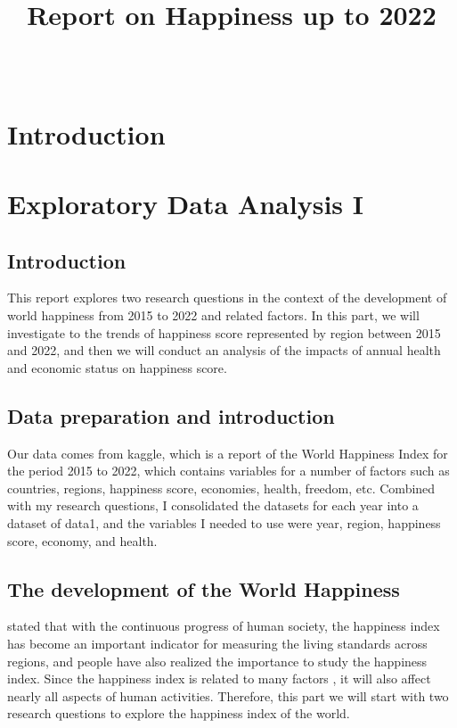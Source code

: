 \documentclass[11pt,a4paper,]{article}
\title{Report on Happiness up to 2022}
\author{\sf{\Large\textbf{(Elvis) Zhixiang Yang}\\\large EBS Honours Student\\[0.5cm]}{\Large\textbf{Yiqi Wang}\\\large Master of BA Student\\[0.5cm]}{\Large\textbf{Xintong You}\\\large Master of BA Student\\[0.5cm]}}
\date{\sf\Date~\Month~\Year}
\makeatletter
\def\titlepage{\front{\expandafter{\@title}}{\@author}{\@organization}}
\makeatother
\begin{document}
\titlepage

{
\setcounter{tocdepth}{2}
\tableofcontents
}
\clearpage

\hypertarget{introduction}{%
\section{Introduction}\label{introduction}}

\hypertarget{exploratory-data-analysis-i}{%
\section{Exploratory Data Analysis I}\label{exploratory-data-analysis-i}}

\hypertarget{introduction-1}{%
\subsection{Introduction}\label{introduction-1}}

This report explores two research questions in the context of the development of world happiness from 2015 to 2022 and related factors. In this part, we will investigate to the trends of happiness score represented by region between 2015 and 2022, and then we will conduct an analysis of the impacts of annual health and economic status on happiness score.

\hypertarget{data-preparation-and-introduction}{%
\subsection{Data preparation and introduction}\label{data-preparation-and-introduction}}

Our data comes from kaggle, which is a report of the World Happiness Index for the period 2015 to 2022, which contains variables for a number of factors such as countries, regions, happiness score, economies, health, freedom, etc. Combined with my research questions, I consolidated the datasets for each year into a dataset of data1, and the variables I needed to use were year, region, happiness score, economy, and health.

\hypertarget{the-development-of-the-world-happiness}{%
\subsection{The development of the World Happiness}\label{the-development-of-the-world-happiness}}

\textcite{helliwell2012state} stated that with the continuous progress of human society, the happiness index has become an important indicator for measuring the living standards across regions, and people have also realized the importance to study the happiness index. Since the happiness index is related to many factors , it will also affect nearly all aspects of human activities. Therefore, this part we will start with two research questions to explore the happiness index of the world.
\end{document}
